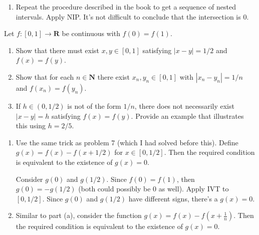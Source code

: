 \documentclass{oxmathproblems}
\begin{document}
\begin{questions}
\begin{solution}
\begin{enumerate}[label=(\alph*)]
    Formally, we prove by contradiction. First we note that since $s = \text{sup } K$, if $x > s$ then $x \notin K$ hence $f(x) > 0$.
    
    Now let $\epsilon = |f(s)|$. By continuity, there exists a $\delta < (b-s)$ that works (the bound $(b-s)$ is just a trivial detail to ensure
    we stay within $[a, b]$). Choose $x$ such that $x-s < \delta$. Since $f$ is defined on $[a, b]$, $f(x)$ is defined.
    
    We've asserted that $f(x) > 0$. But since $f(s) < 0$, we have $f(x)-f(s) \geq |0-f(s)| = \epsilon$, contradicting continuity of $f$.
    
    \item Repeat the procedure described in the book to get a sequence of nested intervals. Apply NIP. It's not difficult to conclude that the intersection is 0.
  \end{enumerate}
\end{solution}

\miquestion Let $f: [0, 1] \to \textbf{R}$ be continuous with $f(0)=f(1)$.
\begin{enumerate}[label=(\alph*)]
  \item Show that there must exist $x, y \in [0, 1]$ satisfying $|x-y|=1/2$ and $f(x)=f(y)$.
  \item Show that for each $n \in \textbf{N}$ there exist $x_{n}, y_{n} \in [0, 1]$ with $|x_{n}-y_{n}|=1/n$ and $f(x_{n})=f(y_{n})$.
  \item If $h \in (0, 1/2)$ is not of the form $1/n$, there does not necessarily exist $|x-y|=h$ satisfying $f(x)=f(y)$. Provide an example that illustrates this using $h=2/5$.
\end{enumerate}

\begin{solution}
  \begin{enumerate}[label=(\alph*)]
    \item Use the same trick as problem 7 (which I had solved before this). Define $g(x)=f(x)-f(x+1/2)$ for $x \in [0, 1/2]$. Then the required condition is equivalent to the existence
    of $g(x)=0$.
    
    Consider $g(0)$ and $g(1/2)$. Since $f(0)=f(1)$, then $g(0)=-g(1/2)$ (both could possibly be 0 as well). Apply IVT to $[0, 1/2]$. Since $g(0)$ and $g(1/2)$
    have different signs, there's a $g(x)=0$.

    \item Similar to part (a), consider the function $g(x) = f(x) - f(x + \frac{1}{n})$. Then the required condition is equivalent to the existence of $g(x) = 0$.
    

\end{enumerate}
\end{solution}
\end{questions}
\end{document}
